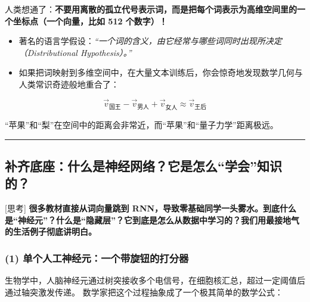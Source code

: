 人类想通了：\textbf{不要用离散的孤立代号表示词，而是把每个词表示为高维空间里的一个坐标点（一个向量，比如 512 个数字）！}
\begin{itemize}
  \item 著名的语言学假设：\textit{“一个词的含义，由它经常与哪些词同时出现所决定（Distributional Hypothesis）。”}
  \item 如果把词映射到多维空间中，在大量文本训练后，你会惊奇地发现数学几何与人类常识奇迹般地重合了：
\end{itemize}

\[
\vec{v}_{\text{国王}} - \vec{v}_{\text{男人}} + \vec{v}_{\text{女人}} \approx \vec{v}_{\text{王后}}
\]

  “苹果”和“梨”在空间中的距离会非常近，而“苹果”和“量子力学”距离极远。

\vspace{0.8em}\hrule\vspace{0.8em}

\subsection{补齐底座：什么是神经网络？它是怎么“学会”知识的？}

\begin{tipBox}[核心直觉与思考]
{}[思考] \textbf{很多教材直接从词向量跳到 RNN，导致零基础同学一头雾水。到底什么是“神经元”？什么是“隐藏层”？它到底是怎么从数据中学习的？我们用最接地气的生活例子彻底讲明白。}
\end{tipBox}

\subsubsection{(1) 单个人工神经元：一个带旋钮的打分器}

生物学中，人脑神经元通过树突接收多个电信号，在细胞核汇总，超过一定阈值后通过轴突激发传递。
数学家把这个过程抽象成了一个极其简单的数学公式：

